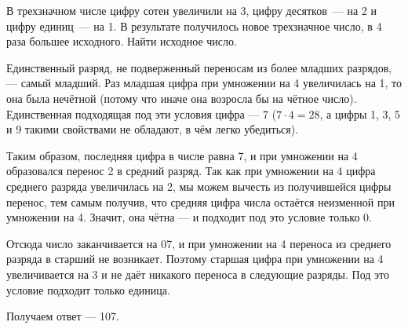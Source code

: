 \begin{itemize}

	\itB В трехзначном числе цифру сотен увеличили на 3, цифру десятков~— на 2 и цифру единиц~— на 1. В результате получилось новое трехзначное число, в 4 раза большее исходного. Найти исходное число.
	
	\itr Единственный разряд, не подверженный переносам из более младших разрядов, — самый младший. Раз младшая цифра при умножении на 4 увеличилась на 1, то она была нечётной (потому что иначе она возросла бы на чётное число). Единственная подходящая под эти условия цифра — 7 ($7 \cdot 4 = 28$, а цифры 1, 3, 5 и 9 такими свойствами не обладают, в чём легко убедиться).
	
	Таким образом, последняя цифра в числе равна 7, и при умножении на 4 образовался перенос 2 в средний разряд. Так как при умножении на 4 цифра среднего разряда увеличилась на 2, мы можем вычесть из получившейся цифры перенос, тем самым получив, что средняя цифра числа остаётся неизменной при умножении на 4. Значит, она чётна — и подходит под это условие только 0.
	
	Отсюда число заканчивается на 07, и при умножении на 4 переноса из среднего разряда в старший не возникает. Поэтому старшая цифра при умножении на 4 увеличивается на 3 и не даёт никакого переноса в следующие разряды. Под это условие подходит только единица.
	
	Получаем ответ — 107.

\end{itemize}